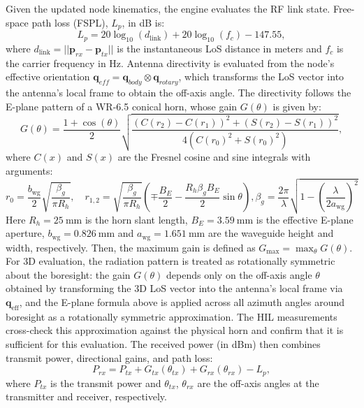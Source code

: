 \documentclass[fleqn,10pt]{wlscirep}
\newcommand{\rev}[1]{{\color{revblue}#1}}
\begin{document}
Given the updated node kinematics, the engine evaluates the RF link state. Free-space path loss (FSPL), $L_p$, in dB is:
\begin{equation}
    L_{p} = 20 \log_{10}(d_{\text{link}}) + 20 \log_{10}(f_c) - 147.55,
\end{equation}
where $d_{\text{link}} = ||\mathbf{p}_{rx} - \mathbf{p}_{tx}||$ is the instantaneous LoS distance in meters and $f_c$ is the carrier frequency in Hz. Antenna directivity is evaluated from the node's effective orientation $\mathbf{q}_{eff} = \mathbf{q}_{body} \otimes \mathbf{q}_{rotary}$, which transforms the LoS vector into the antenna's local frame to obtain the off-axis angle. The directivity follows the E-plane pattern of a WR-6.5 conical horn, whose gain $G(\theta)$ is given by:
\begin{equation}
    G(\theta) = \frac{1 + \cos(\theta)}{2} \sqrt{\frac{(C(r_2) - C(r_1))^2 + (S(r_2) - S(r_1))^2}{4(C(r_0)^2 + S(r_0)^2)}},
\end{equation}
where $C(x)$ and $S(x)$ are the Fresnel cosine and sine integrals with arguments:
\begin{equation}
    r_0 = \frac{b_\mathrm{wg}}{2}\sqrt{\frac{\beta_g}{\pi R_h}}, \quad
    r_{1,2} = \sqrt{\frac{\beta_g}{\pi R_h}}\left(\mp\frac{B_E}{2} - \frac{R_h \beta_g B_E}{2}\sin\theta\right),
    \beta_g = \frac{2\pi}{\lambda}\sqrt{1-\left(\frac{\lambda}{2a_\mathrm{wg}}\right)^2}
\end{equation}
Here $R_h = \SI{25}{\milli\meter}$ is the horn slant length, $B_E = \SI{3.59}{\milli\meter}$ is the effective E-plane aperture, $b_\mathrm{wg} = \SI{0.826}{\milli\meter}$ and $a_\mathrm{wg} = \SI{1.651}{\milli\meter}$ are the waveguide height and width, respectively. Then, the maximum gain is defined as $G_\mathrm{max} = \max_{\theta} G(\theta)$. \rev{For 3D evaluation, the radiation pattern is treated as rotationally symmetric about the boresight: the gain $G(\theta)$ depends only on the off-axis angle $\theta$ obtained by transforming the 3D LoS vector into the antenna's local frame via $\mathbf{q}_{\text{eff}}$, and the E-plane formula above is applied across all azimuth angles around boresight as a rotationally symmetric approximation. The HIL measurements cross-check this approximation against the physical horn and confirm that it is sufficient for this evaluation.} The received power (in dBm) then combines transmit power, directional gains, and path loss:
\begin{equation}
P_{rx} = P_{tx} + G_{tx}(\theta_{tx}) + G_{rx}(\theta_{rx}) - L_p,
\end{equation}
where $P_{tx}$ is the transmit power and $\theta_{tx}$, $\theta_{rx}$ are the off-axis angles at the transmitter and receiver, respectively.
\end{document}
